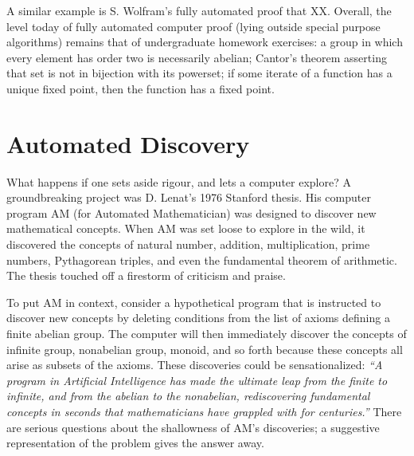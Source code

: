 \documentclass{llncs}
\begin{document}
\bigskip

A similar example is S. Wolfram's fully automated proof that XX.
Overall, the level today of fully automated computer proof (lying outside
special purpose algorithms) remains that of undergraduate
homework exercises: a group in which every element has order two is necessarily abelian; Cantor's theorem asserting that set is not in bijection with its powerset; 
%
if some iterate of a function has a unique fixed point, then
the function has a fixed point.\cite{TPS}


\section{Automated Discovery}

What happens if one sets aside rigour, and lets a computer explore?
A groundbreaking project was D. Lenat's 1976 Stanford thesis.
His computer program AM (for Automated Mathematician) was
designed to discover new mathematical concepts.  When AM was set loose to explore in the wild, it discovered the concepts of natural number, addition, multiplication, prime numbers, Pythagorean triples, and even the fundamental theorem of arithmetic.
The thesis touched off a firestorm of criticism and praise.

To put AM in context, consider a hypothetical program that is instructed to discover new concepts by deleting conditions
from the list of axioms defining a finite abelian group.  The computer will then immediately discover the concepts
of infinite  group,  nonabelian group,  monoid, and so forth because these concepts all
arise as subsets of the axioms.  These discoveries could be sensationalized:
{\it ``A program in Artificial Intelligence 
has made the ultimate leap from the finite to infinite, and from the abelian to the nonabelian,
rediscovering fundamental concepts in seconds that mathematicians have grappled with for centuries.''}
There are serious questions about the shallowness of AM's discoveries; a
suggestive representation of the problem gives the answer away.
\end{document}

